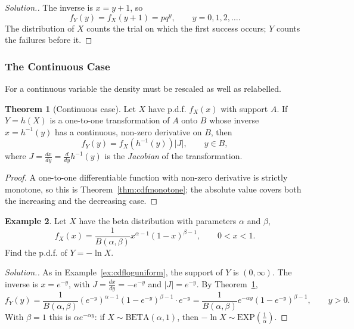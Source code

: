 \documentclass[12pt,a4paper]{report}
\theoremstyle{definition}
\newtheorem{thm}{Theorem}[section]
\newtheorem{example}[thm]{Example}
\theoremstyle{plain}
\newenvironment{solution}
  {\renewcommand{\qedsymbol}{}\begin{proof}[\textit{Solution}.]}
  {\end{proof}}
\begin{document}
\begin{solution}
The inverse is $x = y + 1$, so
\[f_Y(y) = f_X(y+1) = pq^y, \qquad y = 0, 1, 2, \dots .\]
The distribution of $X$ counts the trial on which the first success occurs; $Y$
counts the failures before it.
\end{solution}

\subsubsection{The Continuous Case}

For a continuous variable the density must be rescaled as well as relabelled.

\begin{thm}[Continuous case]
\label{thm:transcont}
Let $X$ have p.d.f. $f_X(x)$ with support $A$. If $Y = h(X)$ is a one-to-one
transformation of $A$ onto $B$ whose inverse $x = h^{-1}(y)$ has a continuous,
non-zero derivative on $B$, then
\[ f_Y(y) = f_X\left(h^{-1}(y)\right) |J| ,\qquad y\in B ,\]
where $J = \frac{dx}{dy} = \frac{d}{dy}h^{-1}(y)$ is the \emph{Jacobian} of the
transformation.
\end{thm}

\begin{proof}
A one-to-one differentiable function with non-zero derivative is strictly
monotone, so this is Theorem~\ref{thm:cdfmonotone}; the absolute value covers
both the increasing and the decreasing case.
\end{proof}

\begin{example}
\label{ex:betalog}
Let $X$ have the beta distribution with parameters $\alpha$ and $\beta$,
\[ f_X(x) = \frac{1}{B(\alpha, \beta)} x^{\alpha - 1}(1 - x)^{\beta - 1}, \qquad 0
< x < 1 .\]
Find the p.d.f. of $Y = -\ln X$.
\end{example}

\begin{solution}
As in Example~\ref{ex:cdfloguniform}, the support of $Y$ is $(0,\infty)$. The
inverse is $x = e^{-y}$, with $J = \frac{dx}{dy} = -e^{-y}$ and $|J| = e^{-y}$.
By Theorem~\ref{thm:transcont},
\[f_Y(y) = \frac{1}{B(\alpha, \beta)} (e^{-y})^{\alpha - 1} (1 - e^{-y})^{\beta -
1} \cdot e^{-y} = \frac{1}{B(\alpha, \beta)} e^{-\alpha y} (1 - e^{-y})^{\beta -
1}, \qquad y > 0 .\]
With $\beta = 1$ this is $\alpha e^{-\alpha y}$: if $X\sim\text{BETA}(\alpha,1)$,
then $-\ln X\sim\text{EXP}\left(\frac1\alpha\right)$.
\end{solution}
\end{document}
